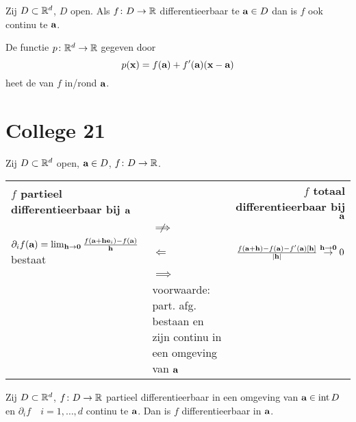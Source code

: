 \documentclass{2wa40summary}
\begin{document}
	\theorem Zij $D \subset \mathbb{R}^d$, $D$ open. Als $f\colon D \to \mathbb{R}$ differentieerbaar te ${\textbf{a}} \in D$ dan is $f$ ook continu te ${\textbf{a}}$.
      		
	 De functie $ p\colon  \mathbb{R}^d \to \mathbb{R} $ gegeven door \[p({\textbf{x}})=f({\textbf{a}})+f'({\textbf{a}})({\textbf{x}}-{\textbf{a}})\] heet de  van $ f $ in/rond $ {\textbf{a}} $.
	
	\newpage	
	\section{College 21}
		Zij $D \subset \mathbb{R}^d$ open, ${\textbf{a}}\in D$, $f\colon D \to \mathbb{R}$.

		
    	\begin{tabular}{l p{3cm} r}
    		\textbf{$f$ partieel differentieerbaar bij ${\textbf{a}}$} & & \textbf{$f$ totaal differentieerbaar bij ${\textbf{a}}$} \\
    		& \center $\centernot \implies$ & \\
 			$\partial_i f({\textbf{a}})= \lim_{{\textbf{h}} \to {\textbf{0}}} \frac{f({\textbf{a}}+{\textbf{h}} {\textbf{e}}_i)-f({\textbf{a}})}{{\textbf{h}}}$ bestaat & \center $\Longleftarrow$ & $\frac{f({\textbf{a}}+{\textbf{h}})-f({\textbf{a}})-f'({\textbf{a}})[{\textbf{h}}]}{|{\textbf{h}}|}\stackrel{{\textbf{h}} \to {\textbf{0}}}{\to} 0$ \\
 			& \center $\implies$ & \\
 			& voorwaarde: part. afg. bestaan en zijn continu in een omgeving van ${\textbf{a}}$& \\   		
		\end{tabular}
		\theorem[K 10.4.5] Zij $D\subset\mathbb{R}^d$, $f\colon D\to\mathbb{R}$ partieel differentieerbaar in een omgeving van ${\textbf{a}} \in \operatorname{\mathop{int}} D$ en $\partial_i f \quad i=1,\dots ,d$ continu te ${\textbf{a}}$. Dan is $f$ differentieerbaar in ${\textbf{a}}$.
		
\end{document}
